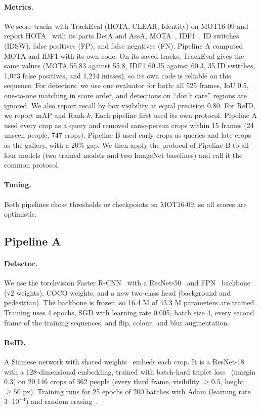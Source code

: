 \documentclass[11pt,letterpaper]{article}
\begin{document}
\paragraph{Metrics.}
We score tracks with TrackEval (HOTA, CLEAR, Identity) on MOT16-09 and report HOTA~\cite{luiten2021hota} with its parts DetA and AssA, MOTA~\cite{bernardin2008clear}, IDF1~\cite{ristani2016idf1}, ID switches (IDSW), false positives (FP), and false negatives (FN).
Pipeline A computed MOTA and IDF1 with its own code.
On its saved tracks, TrackEval gives the same values (MOTA 55.83 against 55.8, IDF1 60.35 against 60.3, 35 ID switches, 1,073 false positives, and 1,214 misses), so its own code is reliable on this sequence.
For detectors, we use one evaluator for both: all 525 frames, IoU 0.5, one-to-one matching in score order, and detections on ``don't care'' regions are ignored.
We also report recall by box visibility at equal precision 0.80.
For ReID, we report mAP and Rank-$k$.
Each pipeline first used its own protocol.
Pipeline A used every crop as a query and removed same-person crops within 15 frames (24 unseen people, 747 crops).
Pipeline B used early crops as queries and late crops as the gallery, with a 20\% gap.
We then apply the protocol of Pipeline B to all four models (two trained models and two ImageNet baselines) and call it the common protocol.

\paragraph{Tuning.}
Both pipelines chose thresholds or checkpoints on MOT16-09, so all scores are optimistic.

\subsection{Pipeline A}\label{sec:pipeA}
\paragraph{Detector.}
We use the torchvision Faster R-CNN~\cite{ren2015faster} with a ResNet-50~\cite{he2016resnet} and FPN~\cite{lin2017fpn} backbone (v2 weights), COCO weights, and a new two-class head (background and pedestrian).
The backbone is frozen, so 16.4 M of 43.3 M parameters are trained.
Training uses 4 epochs, SGD with learning rate 0.005, batch size 4, every second frame of the training sequences, and flip, colour, and blur augmentation.

\paragraph{ReID.}
A Siamese network with shared weights~\cite{taigman2014deepface} embeds each crop.
It is a ResNet-18 with a 128-dimensional embedding, trained with batch-hard triplet loss~\cite{hermans2017triplet} (margin 0.3) on 20,146 crops of 362 people (every third frame, visibility $\geq 0.5$, height $\geq 50$ px).
Training runs for 25 epochs of 200 batches with Adam (learning rate $3\cdot10^{-4}$) and random erasing~\cite{zhong2020erasing}.
\end{document}
